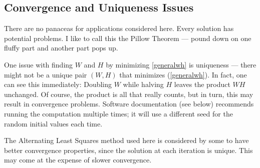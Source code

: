 % 
% 
% 
% 
% 

\subsection{Convergence and Uniqueness Issues}

There are no panaceas for applications considered here.  Every solution
has potential problems.  I like to call this the Pillow Theorem ---
pound down on one fluffy part and another part pops up.

One issue with finding $W$ and $H$ by minimizing \ref{generalwh} is
uniqueness --- there might not be a unique pair $(W,H)$ that minimizes
(\ref{generalwh}).  In fact, one can see this immediately:  Doubling $W$
while halving $H$ leaves the product $WH$ unchanged.  Of course, the
product is all that really counts, but in turn, this may result in
convergence problems. Software documentation (see below) recommends
running the computation multiple times; it will use a different seed for
the random initial values each time.

The Alternating Least Squares method used here is considered by some to
have better convergence properties, since the solution at each iteration
is unique.  This may come at the expense of slower convergence.

